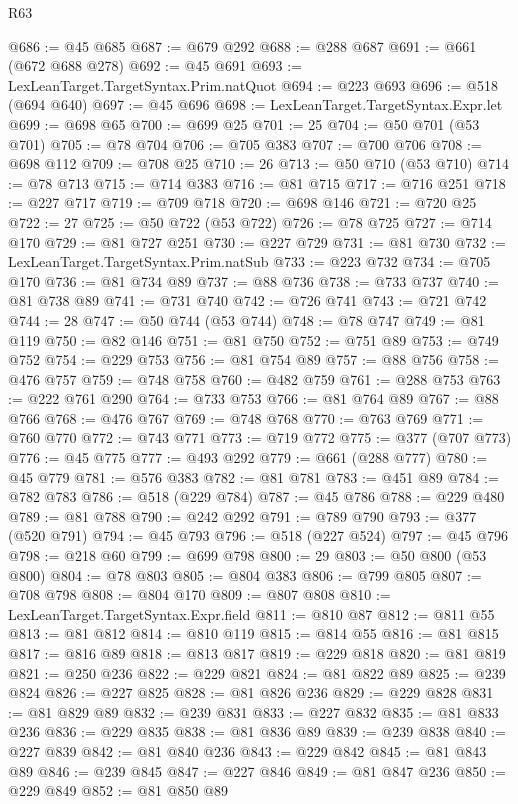 \begin{lexlean}{R63}
\begin{coremodule}
@686 := @45 @685
@687 := @679 @292
@688 := @288 @687
@691 := @661 (@672 @688 @278)
@692 := @45 @691
@693 := LexLeanTarget.TargetSyntax.Prim.natQuot
@694 := @223 @693
@696 := @518 (@694 @640)
@697 := @45 @696
@698 := LexLeanTarget.TargetSyntax.Expr.let
@699 := @698 @65
@700 := @699 @25
@701 := 25
@704 := @50 @701 (@53 @701)
@705 := @78 @704
@706 := @705 @383
@707 := @700 @706
@708 := @698 @112
@709 := @708 @25
@710 := 26
@713 := @50 @710 (@53 @710)
@714 := @78 @713
@715 := @714 @383
@716 := @81 @715
@717 := @716 @251
@718 := @227 @717
@719 := @709 @718
@720 := @698 @146
@721 := @720 @25
@722 := 27
@725 := @50 @722 (@53 @722)
@726 := @78 @725
@727 := @714 @170
@729 := @81 @727 @251
@730 := @227 @729
@731 := @81 @730
@732 := LexLeanTarget.TargetSyntax.Prim.natSub
@733 := @223 @732
@734 := @705 @170
@736 := @81 @734 @89
@737 := @88 @736
@738 := @733 @737
@740 := @81 @738 @89
@741 := @731 @740
@742 := @726 @741
@743 := @721 @742
@744 := 28
@747 := @50 @744 (@53 @744)
@748 := @78 @747
@749 := @81 @119
@750 := @82 @146
@751 := @81 @750
@752 := @751 @89
@753 := @749 @752
@754 := @229 @753
@756 := @81 @754 @89
@757 := @88 @756
@758 := @476 @757
@759 := @748 @758
@760 := @482 @759
@761 := @288 @753
@763 := @222 @761 @290
@764 := @733 @753
@766 := @81 @764 @89
@767 := @88 @766
@768 := @476 @767
@769 := @748 @768
@770 := @763 @769
@771 := @760 @770
@772 := @743 @771
@773 := @719 @772
@775 := @377 (@707 @773)
@776 := @45 @775
@777 := @493 @292
@779 := @661 (@288 @777)
@780 := @45 @779
@781 := @576 @383
@782 := @81 @781
@783 := @451 @89
@784 := @782 @783
@786 := @518 (@229 @784)
@787 := @45 @786
@788 := @229 @480
@789 := @81 @788
@790 := @242 @292
@791 := @789 @790
@793 := @377 (@520 @791)
@794 := @45 @793
@796 := @518 (@227 @524)
@797 := @45 @796
@798 := @218 @60
@799 := @699 @798
@800 := 29
@803 := @50 @800 (@53 @800)
@804 := @78 @803
@805 := @804 @383
@806 := @799 @805
@807 := @708 @798
@808 := @804 @170
@809 := @807 @808
@810 := LexLeanTarget.TargetSyntax.Expr.field
@811 := @810 @87
@812 := @811 @55
@813 := @81 @812
@814 := @810 @119
@815 := @814 @55
@816 := @81 @815
@817 := @816 @89
@818 := @813 @817
@819 := @229 @818
@820 := @81 @819
@821 := @250 @236
@822 := @229 @821
@824 := @81 @822 @89
@825 := @239 @824
@826 := @227 @825
@828 := @81 @826 @236
@829 := @229 @828
@831 := @81 @829 @89
@832 := @239 @831
@833 := @227 @832
@835 := @81 @833 @236
@836 := @229 @835
@838 := @81 @836 @89
@839 := @239 @838
@840 := @227 @839
@842 := @81 @840 @236
@843 := @229 @842
@845 := @81 @843 @89
@846 := @239 @845
@847 := @227 @846
@849 := @81 @847 @236
@850 := @229 @849
@852 := @81 @850 @89

\end{coremodule}
\end{lexlean}
